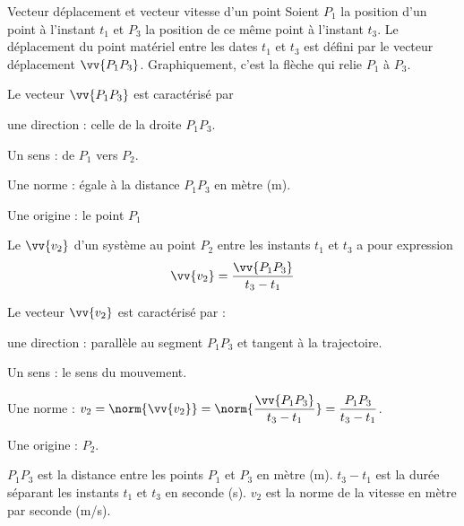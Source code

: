 \begin{doc}{Vecteur déplacement et vecteur vitesse d'un point}
  \label{doc:vitesse}
  Soient $P_1$ la position d'un point à l'instant $t_1$ et $P_3$ la position de ce même point à l'instant $t_3$.
  Le déplacement du point matériel entre les dates $t_1$ et $t_3$ est défini par le vecteur déplacement $\vv{P_1 P_3}$.
  Graphiquement, c'est la flèche qui relie $P_1$ à $P_3$. 
  \bigskip
  
  Le vecteur $\vv{P_1 P_3}$ est caractérisé par
  \begin{listePoints}
    \item une direction : celle de la droite $P_1 P_3$.
    \item Un sens : de $P_1$ vers $P_2$.
    \item Une norme : égale à la distance $P_1 P_3$ en mètre (m).
    \item Une origine : le point $P_1$
  \end{listePoints}
  
  \begin{encart}
    Le  $\vv{v_2}$ d'un système au point $P_2$ entre les instants $t_1$ et $t_3$ a pour expression
    \begin{equation}
      \vv{v_2} = \frac{\vv{P_1 P_3}}{t_3 - t_1}
    \end{equation}
  \end{encart}
  
  Le vecteur $\vv{v_2}$ est caractérisé par :
  \begin{listePoints}
    \item une direction : parallèle au segment $P_1 P_3$ et tangent à la trajectoire.
    \item Un sens : le sens du mouvement.
    \item Une norme : $v_2 
    = \norm{\vv{v_2}}
    = \displaystyle \norm{\frac{\vv{P_1 P_3}}{t_3 - t_1}}
    = \displaystyle \frac{P_1 P_3}{t_3 - t_1}$.
    \item Une origine : $P_2$.
  \end{listePoints}
  $P_1 P_3$ est la distance entre les points $P_1$ et $P_3$ en mètre (m). $t_3 - t_1$ est la durée séparant les instants $t_1$ et $t_3$ en seconde (s). $v_2$ est la norme de la vitesse en mètre par seconde (m/s).
\end{doc}



\newpage
{}

